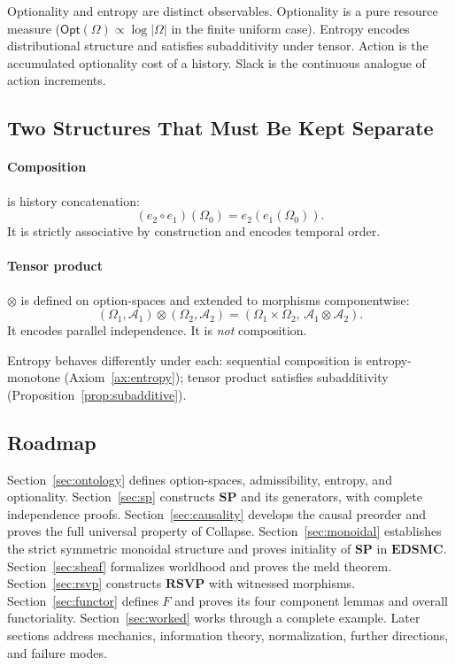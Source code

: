 \documentclass[12pt,a4paper]{article}
\theoremstyle{definition}
\theoremstyle{remark}
\newcommand{\Opt}{\mathsf{Opt}}
\newcommand{\SP}{\mathbf{SP}}
\newcommand{\RSVP}{\mathbf{RSVP}}
\newcommand{\EDSMC}{\mathbf{EDSMC}}
\newcommand{\tensor}{\otimes}
\begin{document}
Optionality and entropy are distinct observables. Optionality is a pure resource
measure ($\Opt(\Omega)\propto\log|\Omega|$ in the finite uniform case). Entropy
encodes distributional structure and satisfies subadditivity under tensor. Action
is the accumulated optionality cost of a history. Slack is the continuous analogue
of action increments.

\subsection{Two Structures That Must Be Kept Separate}

\paragraph{Composition} is history concatenation:
\[
  (e_2\circ e_1)(\Omega_0) = e_2(e_1(\Omega_0)).
\]
It is strictly associative by construction and encodes temporal order.

\paragraph{Tensor product} $\tensor$ is defined on option-spaces and extended to
morphisms componentwise:
\[
  (\Omega_1,\mathcal{A}_1)\tensor(\Omega_2,\mathcal{A}_2)
  = (\Omega_1\times\Omega_2,\,\mathcal{A}_1\tensor\mathcal{A}_2).
\]
It encodes parallel independence. It is \emph{not} composition.

Entropy behaves differently under each: sequential composition is entropy-monotone
(Axiom~\ref{ax:entropy}); tensor product satisfies subadditivity
(Proposition~\ref{prop:subadditive}).

\subsection{Roadmap}

Section~\ref{sec:ontology} defines option-spaces, admissibility, entropy, and
optionality. Section~\ref{sec:sp} constructs $\SP$ and its generators, with complete
independence proofs. Section~\ref{sec:causality} develops the causal preorder and
proves the full universal property of Collapse. Section~\ref{sec:monoidal} establishes
the strict symmetric monoidal structure and proves initiality of $\SP$ in $\EDSMC$.
Section~\ref{sec:sheaf} formalizes worldhood and proves the meld theorem.
Section~\ref{sec:rsvp} constructs $\RSVP$ with witnessed morphisms.
Section~\ref{sec:functor} defines $F$ and proves its four component lemmas and
overall functoriality. Section~\ref{sec:worked} works through a complete example.
Later sections address mechanics, information theory, normalization, further
directions, and failure modes.
\end{document}
